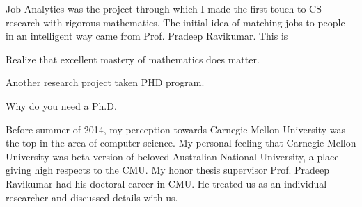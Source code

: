 \documentclass{article}
\begin{document}
Job Analytics was the project through which I made the first touch to
CS research with rigorous mathematics. The initial idea of
matching jobs to people in an intelligent way came from Prof. Pradeep Ravikumar.
This is 

Realize that excellent mastery of mathematics does matter.

Another research project taken PHD program.


Why do you need a Ph.D.

Before summer of 2014, my perception towards Carnegie Mellon University was
the top in the area of computer science. 
My personal feeling that Carnegie Mellon University was beta version of
beloved Australian National University, a place giving high respects to the
CMU.
My honor thesis supervisor Prof. Pradeep Ravikumar had his doctoral career in
CMU. He treated us as an individual researcher and discussed details with us.
\end{document}
